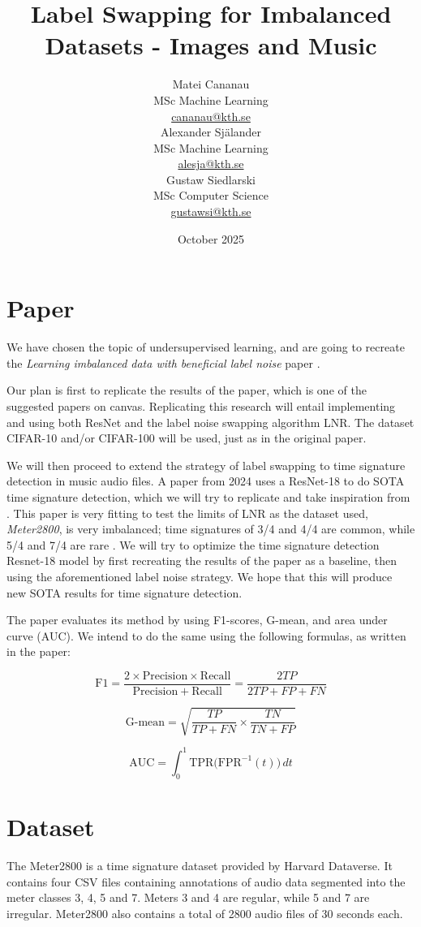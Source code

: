 \documentclass{article}
\title{Label Swapping for Imbalanced Datasets - Images and Music}
\author{
    \begin{minipage}[t]{0.24\textwidth}
        \centering
        Matei Cananau \\
        MSc Machine Learning \\
        \href{mailto:cananau@kth.se}{cananau@kth.se}
    \end{minipage}
    \hfill
        \begin{minipage}[t]{0.24\textwidth}
        \centering
        Alexander Själander \\
        MSc Machine Learning \\
        \href{mailto:alesja@kth.se}{alesja@kth.se}
    \end{minipage}
    \hfill
    \begin{minipage}[t]{0.24\textwidth}
        \centering
        Gustaw Siedlarski \\
        MSc Computer Science \\
        \href{mailto:gustawsi@kth.se}{gustawsi@kth.se}
    \end{minipage}
    \hfill
}
\date{October 2025}
\begin{document}
\maketitle


\section{Paper}
We have chosen the topic of undersupervised learning, and are going to recreate the \textit{Learning imbalanced data with beneficial label noise} paper \cite{ben_labels}.

Our plan is first to replicate the results of the paper, which is one of the suggested papers on canvas. Replicating this research will entail implementing and using both ResNet and the label noise swapping algorithm LNR. The dataset CIFAR-10 and/or CIFAR-100 will be used, just as in the original paper.

We will then proceed to extend the strategy of label swapping to time signature detection in music audio files. A paper from 2024 uses a ResNet-18 to do SOTA time signature detection, which we will try to replicate and take inspiration from \cite{timesig_resnet18}. This paper is very fitting to test the limits of LNR as the dataset used, \textit{Meter2800}, is very imbalanced; time signatures of 3/4 and 4/4 are common, while 5/4 and 7/4 are rare \cite{meter2800}. We will try to optimize the time signature detection Resnet-18 model by first recreating the results of the paper as a baseline, then using the aforementioned label noise strategy. We hope that this will produce new SOTA results for time signature detection.


The paper evaluates its method by using F1-scores, G-mean, and area under curve (AUC). We intend to do the same using the following formulas, as written in the paper:

$$
\mathrm{F1} = \frac{2 \times \mathrm{Precision} \times \mathrm{Recall}}{\mathrm{Precision} + \mathrm{Recall}} 
= \frac{2TP}{2TP + FP + FN}
$$

$$
\mathrm{G\text{-}mean} = \sqrt{\frac{TP}{TP + FN} \times \frac{TN}{TN + FP}}
$$

$$
\mathrm{AUC} = \int_{0}^{1} \mathrm{TPR}\bigl(\mathrm{FPR}^{-1}(t)\bigr)\, dt
$$





\section{Dataset}
The Meter2800 is a time signature dataset provided by Harvard Dataverse. It contains four CSV files containing annotations of audio data segmented into the meter classes 3, 4, 5 and 7. Meters 3 and 4 are regular, while 5 and 7 are irregular. Meter2800 also contains a total of 2800 audio files of 30 seconds each.
\end{document}
